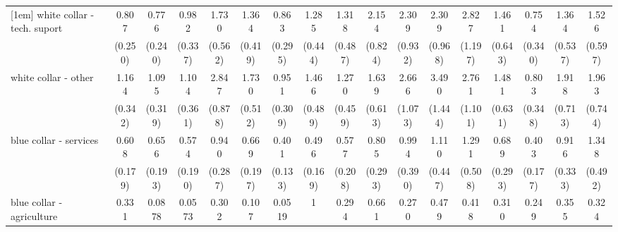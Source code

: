 {\begin{tabular}{l*{16}{c}}
[1em]
white collar - tech. suport&       0.807         &       0.776         &       0.982         &       1.730         &       1.364         &       0.863         &       1.285         &       1.318         &       2.154\sym{*}  &       2.309\sym{*}  &       2.309\sym{*}  &       2.827\sym{*}  &       1.461         &       0.754         &       1.364         &       1.526         \\
                    &     (0.250)         &     (0.240)         &     (0.337)         &     (0.562)         &     (0.419)         &     (0.295)         &     (0.444)         &     (0.487)         &     (0.824)         &     (0.932)         &     (0.968)         &     (1.197)         &     (0.643)         &     (0.340)         &     (0.537)         &     (0.597)         \\
[1em]
white collar - other&       1.164         &       1.095         &       1.104         &       2.847\sym{***}&       1.730         &       0.951         &       1.466         &       1.270         &       1.639         &       2.666\sym{*}  &       3.490\sym{**} &       2.761\sym{*}  &       1.481         &       0.803         &       1.918         &       1.963         \\
                    &     (0.342)         &     (0.319)         &     (0.361)         &     (0.878)         &     (0.512)         &     (0.309)         &     (0.489)         &     (0.459)         &     (0.613)         &     (1.073)         &     (1.444)         &     (1.101)         &     (0.631)         &     (0.348)         &     (0.713)         &     (0.744)         \\
[1em]
blue collar - services&       0.608         &       0.656         &       0.574         &       0.940         &       0.669         &       0.401\sym{**} &       0.496\sym{*}  &       0.577         &       0.805         &       0.994         &       1.110         &       1.291         &       0.689         &       0.403\sym{*}  &       0.916         &       1.348         \\
                    &     (0.179)         &     (0.193)         &     (0.190)         &     (0.287)         &     (0.197)         &     (0.133)         &     (0.169)         &     (0.208)         &     (0.293)         &     (0.390)         &     (0.447)         &     (0.508)         &     (0.293)         &     (0.177)         &     (0.333)         &     (0.492)         \\
[1em]
blue collar - agriculture&       0.331         &      0.0878\sym{**} &      0.0573\sym{*}  &       0.302         &       0.107\sym{*}  &      0.0519\sym{**} &           1         &       0.294         &       0.661         &       0.270         &       0.479         &       0.418         &       0.310         &       0.249         &       0.355         &       0.324         \\

\end{tabular}}
